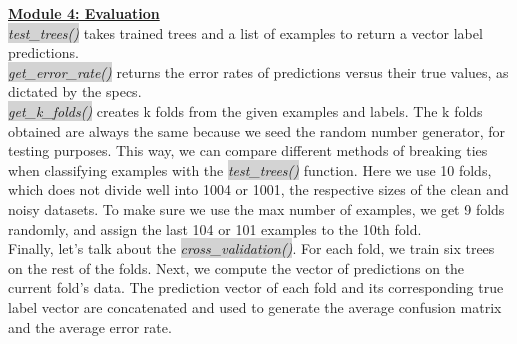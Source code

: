 \textbf{\underline{Module 4: Evaluation}} \\
\colorbox{lightgray}{\emph{test\_trees()}} takes trained trees and a list of examples to return a vector label predictions.\\
\colorbox{lightgray}{\emph{get\_error\_rate()}} returns the error rates of predictions versus their true values, as dictated by the specs.\\
\colorbox{lightgray}{\emph{get\_k\_folds()}} creates k folds from the given examples and labels. The k folds obtained are always the same
because we seed the random number generator, for testing purposes.
This way, we can compare different methods of breaking ties when classifying examples with the  \colorbox{lightgray}{\emph{test\_trees()}} function.
Here we use 10 folds, which does not divide well into 1004 or 1001, the respective sizes of the clean and noisy datasets.
To make sure we use the max number of examples, we get 9 folds randomly, and assign the last 104 or 101 examples to the
10th fold.\\
Finally, let's talk about the  \colorbox{lightgray}{\emph{cross\_validation()}}.
For each fold, we train six trees on the rest of the folds. Next, we compute the vector of predictions on the current fold's data.
The prediction vector of each fold and its corresponding true label vector are concatenated and used to generate the average confusion
matrix and the average error rate.
